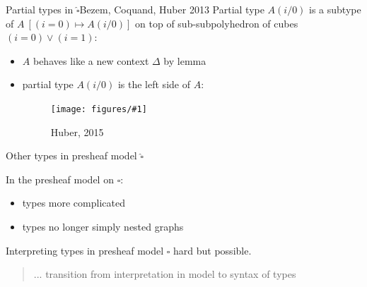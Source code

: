 \documentclass[english]{beamer}
\newcommand{\fig}[2]{
    \begin{figure}\begin{center}\texttt{[image: figures/\#1]}\caption{#2\label{#1}}\end{center}
    \end{figure}}
\begin{document}
\begin{frame}{Partial types in $\widehat{\square}$}{Bezem, Coquand, Huber 2013}
 Partial type $A(i/0)$ is a subtype of $A\ [(i = 0) \mapsto A(i/0)]$ on top of sub-subpolyhedron of cubes $(i=0)\vee (i=1)$:
 
\begin{itemize}
    \item $A$ behaves like a new context $\Delta$ by lemma
    \item partial type $A(i/0)$ is the left side of $A$:
            \fig{types_side}{Huber, 2015}
\end{itemize}

 
 
\end{frame}

\begin{frame}{Other types in presheaf model $\widehat{\square}$}

In the presheaf model on $\square$:
\begin{itemize}
    \item types more complicated
    \item types no longer simply nested graphs
\end{itemize}


Interpreting types in presheaf model $\square$ hard but possible.


\begin{quotation}
 ... transition from interpretation in model to syntax of types
\end{quotation}


\end{frame}
\end{document}
